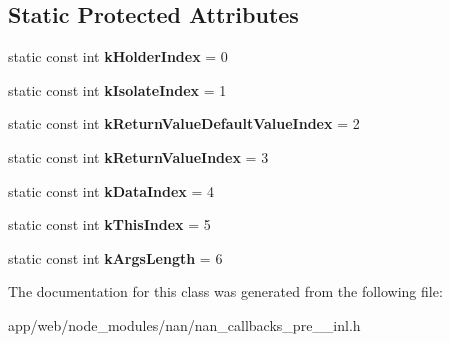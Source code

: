 \subsection*{Static Protected Attributes}
\begin{DoxyCompactItemize}
\item 
\mbox{\label{class_property_callback_info_base_aafce1d5cc7e17a86b463cf0bef5f4f38}} 
static const int {\bfseries k\+Holder\+Index} = 0
\item 
\mbox{\label{class_property_callback_info_base_afd9e106dee96ac32e85e559b17d5824f}} 
static const int {\bfseries k\+Isolate\+Index} = 1
\item 
\mbox{\label{class_property_callback_info_base_ab9ec84842859920780fd6bca8ad75a88}} 
static const int {\bfseries k\+Return\+Value\+Default\+Value\+Index} = 2
\item 
\mbox{\label{class_property_callback_info_base_acc6f04635753315ac5c3dae978d582b8}} 
static const int {\bfseries k\+Return\+Value\+Index} = 3
\item 
\mbox{\label{class_property_callback_info_base_a5497eb9d1e332982258131b110255a6b}} 
static const int {\bfseries k\+Data\+Index} = 4
\item 
\mbox{\label{class_property_callback_info_base_a5f5082cca47c3dc0e4fbd27c4e620815}} 
static const int {\bfseries k\+This\+Index} = 5
\item 
\mbox{\label{class_property_callback_info_base_a72d9c141542cb5a02cf0b74d6411d6f6}} 
static const int {\bfseries k\+Args\+Length} = 6
\end{DoxyCompactItemize}


The documentation for this class was generated from the following file\+:\begin{DoxyCompactItemize}
\item 
app/web/node\+\_\+modules/nan/nan\+\_\+callbacks\+\_\+pre\+\_\+\_\+inl.\+h\end{DoxyCompactItemize}
